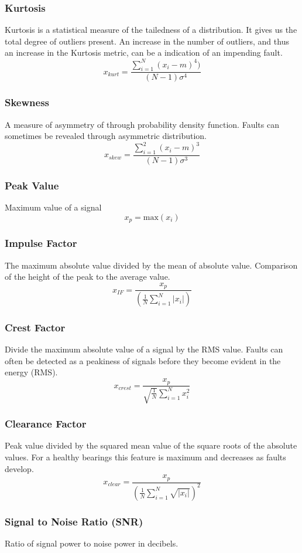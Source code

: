 \documentclass[]{article}
\begin{document}
\subsubsection*{Kurtosis}
Kurtosis is a statistical measure of the tailedness of a distribution. It gives us the total degree of outliers present. An increase in the number of outliers, and thus an increase in the Kurtosis metric, can be a indication of an impending fault.
$$ x_{kurt} = \frac{\sum^N_{i=1}(x_i-m)^4)}{(N-1)\sigma^4} $$ 
\subsubsection*{Skewness} 
A measure of asymmetry of through probability density function. Faults can sometimes be revealed through asymmetric distribution.
$$ x_{skew} = \frac{\sum^2_{i=1}(x_i-m)^3}{(N-1)\sigma^3} $$
\subsubsection*{Peak Value}
Maximum value of a signal
$$ x_p = \textrm{max}(x_i) $$ 
\subsubsection*{Impulse Factor} 
The maximum absolute value divided by the mean of absolute value. Comparison of the height of the peak to the average value.
$$ x_{IF} = \frac{x_p}{(\frac{1}{N}\sum^N_{i=1}|x_i|)} $$  
\subsubsection*{Crest Factor} 
Divide the maximum absolute value of a signal by the \gls{RMS} value.
Faults can often be detected as a peakiness of signals before they become evident in the energy (\gls{RMS}).
$$ x_{crest} = \frac{x_p}{\sqrt{\frac{1}{N}}\sum^N_{i=1}x^2_i} $$
\subsubsection*{Clearance Factor} 
Peak value divided by the squared mean value of the square roots of the absolute values. For a healthy bearings this feature is maximum and decreases as faults develop.
$$ x_{clear} = \frac{x_p}{(\frac{1}{N}\sum^N_{i=1}\sqrt{|x_i|})^2} $$
\subsubsection*{Signal to Noise Ratio (\gls{SNR})}
Ratio of signal power to noise power in decibels.
\end{document}

